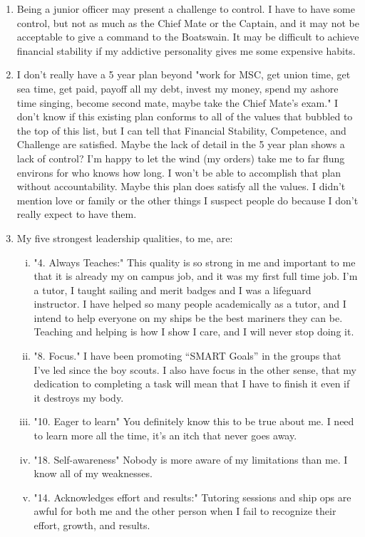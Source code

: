 \documentclass{article}[letterpaper,12pt]
\begin{document}
\begin{enumerate}
	\item Being a junior officer may present a challenge to control. I have to have some control, but not as much as the Chief Mate or the Captain, and it may not be acceptable to give a command to the Boatswain. It may be difficult to achieve financial stability if my addictive personality gives me some expensive habits. 
	\item I don't really have a 5 year plan beyond "work for MSC, get union time, get sea time, get paid, payoff all my debt, invest my money, spend my ashore time singing, become second mate, maybe take the Chief Mate's exam." I don't know if this existing plan conforms to all of the values that bubbled to the top of this list, but I can tell that Financial Stability, Competence, and Challenge are satisfied. Maybe the lack of detail in the 5 year plan shows a lack of control? I'm happy to let the wind (my orders) take me to far flung environs for who knows how long. I won't be able to accomplish that plan without accountability. Maybe this plan does satisfy all the values. I didn't mention love or family or the other things I suspect people do because I don't really expect to have them.
	\item My five strongest leadership qualities, to me, are:
		\begin{enumerate}[i.]
			\item "4. Always Teaches:"\parencite{peitzman_20_2022} This quality is so strong in me and important to me that it is already my on campus job, and it was my first full time job. I'm a tutor, I taught sailing and merit badges and I was a lifeguard instructor. I have helped so many people academically as a tutor, and I intend to help everyone on my ships be the best mariners they can be. Teaching and helping is how I show I care, and I will never stop doing it.
			\item "8. Focus." \parencite{wike_20_2023} I have been promoting ``SMART Goals'' in the groups that I've led since the boy scouts. I also have focus in the other sense, that my dedication to completing a task will mean that I have to finish it even if it destroys my body.
			\item "10. Eager to learn"\parencite{wike_20_2023} You definitely know this to be true about me. I need to learn more all the time, it's an itch that never goes away.
			\item "18. Self-awareness"\parencite{wike_20_2023} Nobody is more aware of my limitations than me. I know all of my weaknesses.
			\item "14. Acknowledges effort and results:"\parencite{peitzman_20_2022} Tutoring sessions and ship ops are awful for both me and the other person when I fail to recognize their effort, growth, and results.

\end{enumerate}
\end{enumerate}
\end{document}
